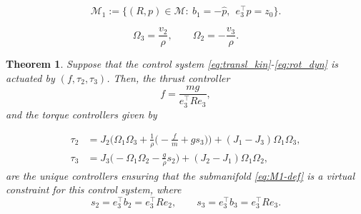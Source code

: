 \documentclass[10pt,a4paper]{amsart}
\newtheorem{theorem}{Theorem}
\begin{document}
\begin{equation}\label{eq:M1-def}
\mathcal{M}_1 := \{(R,p)\in \mathcal{M}:\ b_1 = -\hat{p},\ \ e_3^\top p=z_0\}.
\end{equation}

\begin{equation}\label{eq:Omega23-constraints}
\Omega_3 = \frac{v_2}{\rho},\qquad \Omega_2 = -\frac{v_3}{\rho}.
\end{equation}

\begin{theorem}
    Suppose that the control system \eqref{eq:transl_kin}-\eqref{eq:rot_dyn} is actuated by $(f,\tau_2,\tau_3)$. Then, the thrust controller
    $$f=\frac{mg}{e_3^\top R e_3},$$
    and the torque controllers given by
    
\begin{align}
\tau_2 &= J_2\Big(\Omega_1\Omega_3 + \frac{1}{\rho}\Big(-\frac{f}{m}+g s_3\Big)\Big)+(J_1-J_3)\Omega_1\Omega_3,\nonumber\\
\tau_3 &= J_3\Big(-\Omega_1\Omega_2 - \frac{g}{\rho}s_2\Big)+(J_2-J_1)\Omega_1\Omega_2,\label{eq:tau23-laws}
\end{align} are the unique controllers ensuring that the submanifold \eqref{eq:M1-def} is a virtual constraint for this control system, where
    \[
        s_2=e_3^\top b_2=e_3^\top R e_2,\qquad s_3=e_3^\top b_3=e_3^\top R e_3.
    \]
\end{theorem}
\end{document}
